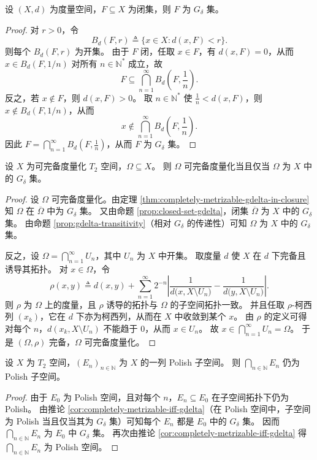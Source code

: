 \documentclass[lang=cn,a4paper,newtx,figureplace=section,tableplace=section]{elegantbook}
\begin{document}
\begin{proposition}\label{prop:closed-set-gdelta}
  设 $(X,d)$ 为度量空间，$F\subseteq X$ 为闭集，则 $F$ 为 $G_\delta$ 集。
\end{proposition}
\begin{proof}
  对 $r>0$，令
  \[
    B_d(F,r)\triangleq\{x\in X: d(x,F)<r\}.
  \]
  则每个 $B_d(F,r)$ 为开集。
  由于 $F$ 闭，任取 $x\in F$，有 $d(x,F)=0$，从而 $x\in B_d(F,1/n)$ 对所有 $n\in\mathbb{N}^*$ 成立，故
  \[
    F\subseteq \bigcap_{n=1}^{\infty}B_d\left(F,\frac{1}{n}\right).
  \]
  反之，若 $x\notin F$，则 $d(x,F)>0$。
  取 $n\in\mathbb{N}^*$ 使 $\frac{1}{n}<d(x,F)$，则 $x\notin B_d(F,1/n)$，从而
  \[
    x\notin \bigcap_{n=1}^{\infty}B_d\left(F,\frac{1}{n}\right).
  \]
  因此 $F=\bigcap_{n=1}^{\infty}B_d\left(F,\frac{1}{n}\right)$，从而 $F$ 为 $G_\delta$ 集。
\end{proof}

\begin{corollary}\label{cor:completely-metrizable-iff-gdelta}
  设 $X$ 为可完备度量化 $T_2$ 空间，$\Omega\subseteq X$。
  则 $\Omega$ 可完备度量化当且仅当 $\Omega$ 为 $X$ 中的 $G_\delta$ 集。
\end{corollary}
\begin{proof}
  设 $\Omega$ 可完备度量化。由定理 \ref{thm:completely-metrizable-gdelta-in-closure} 知 $\Omega$ 在 $\overline{\Omega}$ 中为 $G_\delta$ 集。
  又由命题 \ref{prop:closed-set-gdelta}，闭集 $\overline{\Omega}$ 为 $X$ 中的 $G_\delta$ 集。
  由命题 \ref{prop:gdelta-transitivity}（相对 $G_\delta$ 的传递性）可知 $\Omega$ 为 $X$ 中的 $G_\delta$ 集。

  反之，设 $\Omega=\bigcap_{n=1}^{\infty}U_n$，其中 $U_n$ 为 $X$ 中开集。
  取度量 $d$ 使 $X$ 在 $d$ 下完备且诱导其拓扑。
  对 $x\in\Omega$，令
  \[
    \rho(x,y)\triangleq d(x,y)+\sum_{n=1}^{\infty}2^{-n}\left|\frac{1}{d\bigl(x,X\setminus U_n\bigr)}-\frac{1}{d\bigl(y,X\setminus U_n\bigr)}\right|.
  \]
  则 $\rho$ 为 $\Omega$ 上的度量，且 $\rho$ 诱导的拓扑与 $\Omega$ 的子空间拓扑一致。
  并且任取 $\rho$-柯西列 $(x_k)$，它在 $d$ 下亦为柯西列，从而在 $X$ 中收敛到某个 $x$。
  由 $\rho$ 的定义可得对每个 $n$，$d(x_k,X\setminus U_n)$ 不能趋于 $0$，从而 $x\in U_n$。
  故 $x\in\bigcap_{n=1}^{\infty}U_n=\Omega$。
  于是 $(\Omega,\rho)$ 完备，$\Omega$ 可完备度量化。
\end{proof}

\begin{proposition}\label{prop:polish-intersection}
  设 $X$ 为 $T_2$ 空间，$(E_n)_{n\in\mathbb{N}}$ 为 $X$ 的一列 Polish 子空间。
  则 $\bigcap_{n\in\mathbb{N}}E_n$ 仍为 Polish 子空间。
\end{proposition}
\begin{proof}
  由于 $E_0$ 为 Polish 空间，且对每个 $n$，$E_n\subseteq E_0$ 在子空间拓扑下仍为 Polish。
  由推论 \ref{cor:completely-metrizable-iff-gdelta}（在 Polish 空间中，子空间为 Polish 当且仅当其为 $G_\delta$ 集）可知每个 $E_n$ 都是 $E_0$ 中的 $G_\delta$ 集。
  因而 $\bigcap_{n\in\mathbb{N}}E_n$ 为 $E_0$ 中 $G_\delta$ 集。
  再次由推论 \ref{cor:completely-metrizable-iff-gdelta} 得 $\bigcap_{n\in\mathbb{N}}E_n$ 为 Polish 空间。
\end{proof}
\end{document}
